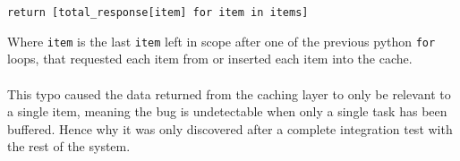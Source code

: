 \verb`return [total_response[item] for item in items]`

Where \verb`item` is the last \verb`item` left in scope after one of the previous python \verb`for` loops, that requested each item from or inserted each item into the cache.

\paragraph{}
This typo caused the data returned from the caching layer to only be relevant to a single item, meaning the bug is undetectable when only a single task has been buffered. Hence why it was only discovered after a complete integration test with the rest of the system.

